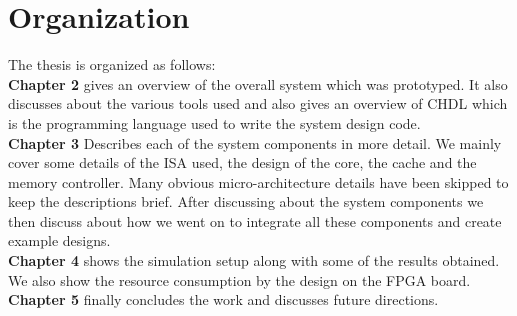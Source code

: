 \section{Organization}
The thesis is organized as follows:
\\ 
\noindent\textbf{Chapter 2} gives an overview of the overall system which was prototyped. It also discusses about the various tools used and also gives an overview of CHDL which is the programming language used to write the system design code.
\\
\noindent\textbf{Chapter 3} Describes each of the system components in more detail. We mainly cover some details of the ISA used, the design of the core, the cache and the memory controller. Many obvious micro-architecture details have been skipped to keep the descriptions brief. After discussing about the system components we then discuss about how we went on to integrate all these components and create example designs.
\\
\noindent\textbf{Chapter 4} shows the simulation setup along with some of the results obtained. We also show the resource consumption by the design on the FPGA board.
\\
\noindent\textbf{Chapter 5} finally concludes the work and discusses future directions. 

